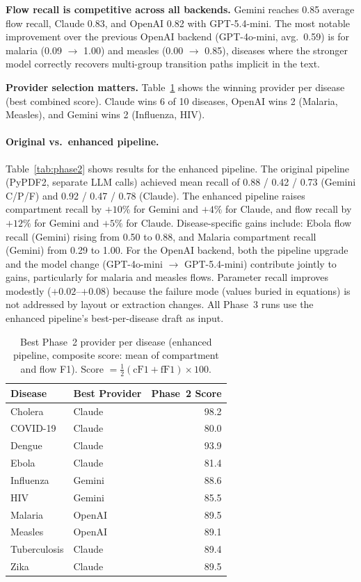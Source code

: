 \noindent\textbf{Flow recall is competitive across all backends.}
Gemini reaches 0.85 average flow recall, Claude 0.83, and OpenAI 0.82 with GPT-5.4-mini.
The most notable improvement over the previous OpenAI backend (GPT-4o-mini, avg.\ 0.59)
is for malaria (0.09 $\to$ 1.00) and measles (0.00 $\to$ 0.85), diseases where the
stronger model correctly recovers multi-group transition paths implicit in the text.

\noindent\textbf{Provider selection matters.}
Table~\ref{tab:best_provider} shows the winning provider per disease (best combined
score). Claude wins 6 of 10 diseases, OpenAI wins 2 (Malaria, Measles), and Gemini wins 2
(Influenza, HIV).

\paragraph{Original vs.\ enhanced pipeline.}
Table~\ref{tab:phase2} shows results for the enhanced pipeline.
The original pipeline (PyPDF2, separate LLM calls) achieved mean recall of
0.88 / 0.42 / 0.73 (Gemini C/P/F) and 0.92 / 0.47 / 0.78 (Claude).
The enhanced pipeline raises compartment recall by $+10\%$ for Gemini and $+4\%$
for Claude, and flow recall by $+12\%$ for Gemini and $+5\%$ for Claude.
Disease-specific gains include: Ebola flow recall (Gemini) rising from 0.50 to 0.88,
and Malaria compartment recall (Gemini) from 0.29 to 1.00.
For the OpenAI backend, both the pipeline upgrade and the model change
(GPT-4o-mini $\to$ GPT-5.4-mini) contribute jointly to gains, particularly for malaria and
measles flows. Parameter recall improves modestly ($+0.02$--$+0.08$) because the failure
mode (values buried in equations) is not addressed by layout or extraction changes.
All Phase~3 runs use the enhanced pipeline's best-per-disease draft as input.

\begin{table}[t]
\caption{Best Phase~2 provider per disease (enhanced pipeline, composite score:
mean of compartment and flow F1). Score $= \frac{1}{2}(\text{cF1}+\text{fF1})\times 100$.}
\label{tab:best_provider}
\small
\begin{tabular}{llr}
\toprule
Disease & Best Provider & Phase~2 Score \\
\midrule
Cholera         & Claude  & 98.2  \\
COVID-19        & Claude  & 80.0  \\
Dengue          & Claude  & 93.9  \\
Ebola           & Claude  & 81.4  \\
Influenza       & Gemini  & 88.6  \\
HIV             & Gemini  & 85.5  \\
Malaria         & OpenAI  & 89.5  \\
Measles         & OpenAI  & 89.1  \\
Tuberculosis    & Claude  & 89.4  \\
Zika            & Claude  & 89.5  \\
\bottomrule
\end{tabular}
\end{table}

